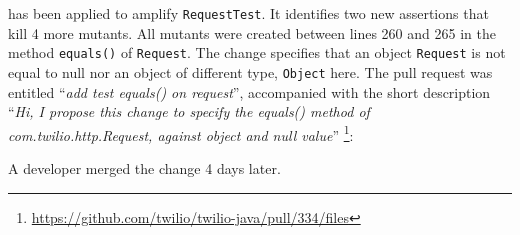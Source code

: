 \dspot has been applied to amplify \texttt{RequestTest}. 
It identifies two new assertions that kill 4 more mutants. 
All mutants were created between lines 260 and 265 in the method \texttt{equals()} of \texttt{Request}. 
The change specifies that an object \texttt{Request} is not equal to null nor an object of different type, \ie \texttt{Object} here. 
The pull request was entitled ``\emph{add test equals() on request}'', accompanied with the short description ``\emph{Hi, I propose this change to specify the equals() method of com.twilio.http.Request, against object and null value}'' \footnote{\url{https://github.com/twilio/twilio-java/pull/334/files}}:
\begin{figure}[H]
	\centering{}
\end{figure}

A developer merged the change 4 days later.

